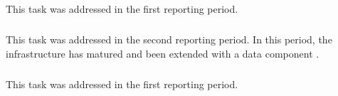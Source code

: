 \subparagraph{}
\label{dksbases@data-foundationCAS}
This task was addressed in the first reporting period. 
%
%
\medskip

\subparagraph{}
\label{dksbases@data-research-categories}
This task was addressed in the second reporting period. In this period, the infrastructure has matured and been extended with a data component \dmh.

\subparagraph{}
\label{dksbases@data-OEIS}
This task was addressed in the first reporting period.
\medskip

